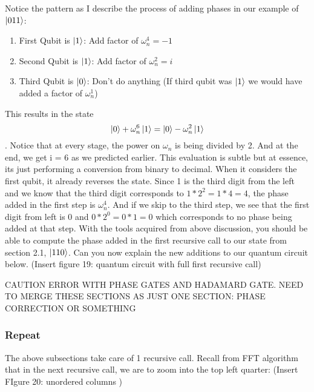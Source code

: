 \documentclass{article}
\newcommand{\om}{\omega_n}
\begin{document}
    Notice the pattern as I describe the process of adding phases in our
    example of \(\ket{011}\):
    \begin{enumerate}
      \item First Qubit is \(\ket{1}\): Add factor of \(\om^4 = -1\)
      \item Second Qubit is \(\ket{1}\): Add factor of \(\om^2 = i\)
      \item Third Qubit is \(\ket{0}\): Don't do anything (If third qubit
      was \(\ket{1}\) we would have added a factor of \(\om^1\))
    \end{enumerate}
    This results in the state
    \[ \ket{0} + \om^6\ket{1} = \ket{0} - \om^2\ket{1} \].
    Notice that at every stage, the power on \(\om\) is being divided by 2.
    And at the end, we get i = 6 as we predicted earlier. This evaluation
    is subtle but at essence, its just performing a conversion from binary
    to decimal. When it considers the first qubit, it already reverses
    the state. Since 1 is the third digit from the left and we know that
    the third digit corresponds to \(1*2^2 = 1*4 = 4\), the phase added in the
    first step is \(\om^4\). And if we skip to the third step, we see that
    the first digit from left is 0 and \(0*2^0 = 0*1 = 0\) which corresponds
    to no phase being added at that step.
    With the tools acquired from above discussion, you should be able to
    compute the phase added in the first recursive call to our state from
    section 2.1, \(\ket{110}\). Can you now explain the new additions to
    our quantum circuit below.
    (Insert figure 19: quantum circuit with full first recursive call)

    CAUTION ERROR WITH PHASE GATES AND HADAMARD GATE. NEED TO MERGE THESE
    SECTIONS AS JUST ONE SECTION: PHASE CORRECTION OR SOMETHING

    \subsubsection{Repeat}
    The above subsections take care of 1 recursive call. Recall from FFT
    algorithm that in the next recursive call, we are to zoom into the
    top left quarter:
    (Insert FIgure 20: unordered columns )
\end{document}
